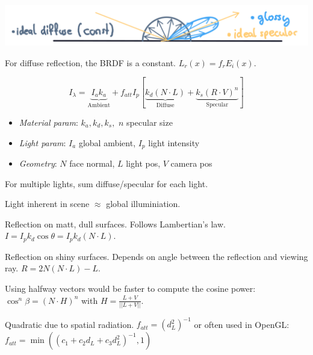 \includegraphics*[width=\linewidth]{assets/reflections.png}

\begin{definition}
  For diffuse reflection, the BRDF is a constant.
  \(L_r(x) = f_r E_i(x)\).
\end{definition}

\begin{algorithm}
  \[I_\lambda = \underbrace{I_a k_a}_{\text{Ambient}} + f_{att}I_p[\underbrace{k_d(N \cdot L)}_{\text{Diffuse}} + \underbrace{k_s(R \cdot V)^n}_{\text{Specular}}]\]
  \begin{itemize}
    \item \textit{Material param}: \(k_a, k_d, k_s,\) \(n\) specular size
    \item \textit{Light param}: \(I_a\) global ambient, \(I_p\) light intensity
    \item \textit{Geometry}: \(N\) face normal, \(L\) light pos, \(V\) camera pos
  \end{itemize}
\end{algorithm}

\begin{theorem}
  For multiple lights, sum diffuse/specular for each light.
\end{theorem}

\begin{definition}[Ambient]
  Light inherent in scene \(\approx\) global illuminiation.
\end{definition}

\begin{definition}[Diffuse]
  Reflection on matt, dull surfaces. Follows Lambertian's law.
  \(I = I_pk_d\cos \theta = I_p k_d(N \cdot L)\).
\end{definition}

\begin{definition}[Specular]
  Reflection on shiny surfaces. Depends on angle between the reflection and viewing ray. \(R=2N(N \cdot L) - L\).
\end{definition}

\begin{theorem}
  Using halfway vectors would be faster to compute the cosine power: \(\cos^n \beta = (N \cdot H)^n\) with \(H = \frac{L + V}{||L + V||}\).
\end{theorem}

\begin{definition}[Attenuation]
  Quadratic due to spatial radiation. \(f_{att} = (d_L^2)^{-1}\) or often used in OpenGL:
  \(f_{att} = \min((c_1 + c_2d_L + c_3d_L^2)^{-1}, 1)\)
\end{definition}
